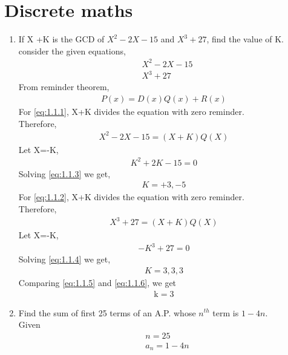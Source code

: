 \documentclass[journal,12pt,twocolumn]{IEEEtran}
\renewcommand\thesection{\arabic{section}}
\begin{document}
\section{Discrete maths}
\renewcommand{\theequation}{\theenumi}
\begin{enumerate}[label=\thesection.\arabic*.,ref=\thesection.\theenumi]
\item If X +K is the GCD of $ X^2-2X-15 $ and $X^3+27$, find the value of K.\\
\solution consider the given equations,
\begin{align}
& X^2-2X-15 \label{eq:1.1.1} \\ 
&X^3+27 \label{eq:1.1.2}
\end{align}
From reminder theorem,
\begin{align}
P(x)=D(x)Q(x)+R(x)
\end{align}
For \eqref{eq:1.1.1}, X+K divides the equation with zero reminder.\\
Therefore,
\begin{align}
X^2-2X-15 = (X+K)Q(X)
\end{align}
Let X=-K,
\begin{align}
K^2+2K-15 = 0 \label{eq:1.1.3}
\end{align}
Solving \eqref{eq:1.1.3} we get, \\
\begin{align}
K =+3, -5 \label{eq:1.1.5}
\end{align}
For \eqref{eq:1.1.2}, X+K divides the equation with zero reminder.\\
Therefore,
\begin{align}
 X^3+27 = (X+K)Q(X)
\end{align}
Let X=-K,
\begin{align}
-K^3+27= 0 \label{eq:1.1.4}
\end{align}
Solving \eqref{eq:1.1.4} we get, \\
\begin{align}
K = 3, 3, 3 \label{eq:1.1.6}
\end{align}
Comparing  \eqref{eq:1.1.5} and \eqref{eq:1.1.6}, we get \begin{align} \text{k}=3 \end{align} 
\item Find the sum of first 25 terms of an A.P. whose $n^{th} $ term is $1-4n$.\\
\solution Given 
\begin{align}
& n= 25 \\
& a_n = 1-4n \\

\end{align}
\end{enumerate}
\end{document}
